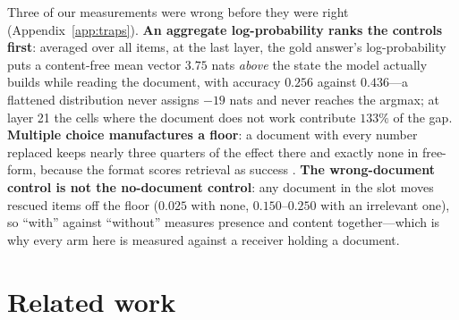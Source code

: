 \documentclass{article}
\begin{document}
Three of our measurements were wrong before they were right
(Appendix~\ref{app:traps}).
\textbf{An aggregate log-probability ranks the controls first}: averaged over
all items, at the last layer, the gold answer's log-probability puts a
content-free mean vector $3.75$ nats \emph{above} the state the model actually
builds while reading the document, with accuracy $0.256$ against $0.436$---a
flattened distribution never assigns $-19$ nats and never reaches the argmax; at
layer 21 the cells where the document does not work contribute $133\%$ of the
gap. \textbf{Multiple choice manufactures a floor}: a document with every number
replaced keeps nearly three quarters of the effect there and exactly none in free-form,
because the format scores retrieval as success \citep{balepur2024artifacts}.
\textbf{The wrong-document control is not the no-document control}: any document in the slot moves rescued
items off the floor ($0.025$ with none, $0.150$--$0.250$ with an irrelevant
one), so ``with'' against ``without'' measures presence and content
together---which is why every arm here is measured against a receiver holding a
document.

\section{Related work}
\end{document}
